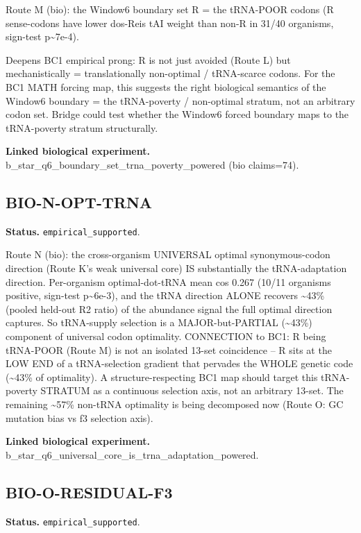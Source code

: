 Route M (bio): the Window6 boundary set R = the tRNA-POOR codons (R sense-codons have lower dos-Reis
tAI weight than non-R in 31/40 organisms, sign-test p\textasciitilde{}7e-4).

Deepens BC1 empirical prong: R is not just avoided (Route L) but mechanistically = translationally
non-optimal / tRNA-scarce codons. For the BC1 MATH forcing map, this suggests the right biological
semantics of the Window6 boundary = the tRNA-poverty / non-optimal stratum, not an arbitrary codon
set. Bridge could test whether the Window6 forced boundary maps to the tRNA-poverty stratum
structurally.

\textbf{Linked biological experiment.} b\_star\_q6\_boundary\_set\_trna\_poverty\_powered (bio claims=74).

\subsection{BIO-N-OPT-TRNA}
\textbf{Status.} \texttt{empirical\_supported}.

Route N (bio): the cross-organism UNIVERSAL optimal synonymous-codon direction (Route K's weak
universal core) IS substantially the tRNA-adaptation direction. Per-organism optimal-dot-tRNA mean
cos 0.267 (10/11 organisms positive, sign-test p\textasciitilde{}6e-3), and the tRNA direction ALONE
recovers \textasciitilde{}43\% (pooled held-out R2 ratio) of the abundance signal the full optimal
direction captures. So tRNA-supply selection is a MAJOR-but-PARTIAL (\textasciitilde{}43\%)
component of universal codon optimality. CONNECTION to BC1: R being tRNA-POOR (Route M) is not an
isolated 13-set coincidence -- R sits at the LOW END of a tRNA-selection gradient that pervades the
WHOLE genetic code (\textasciitilde{}43\% of optimality). A structure-respecting BC1 map should
target this tRNA-poverty STRATUM as a continuous selection axis, not an arbitrary 13-set. The
remaining \textasciitilde{}57\% non-tRNA optimality is being decomposed now (Route O: GC mutation
bias vs f3 selection axis).

\textbf{Linked biological experiment.} b\_star\_q6\_universal\_core\_is\_trna\_adaptation\_powered.

\subsection{BIO-O-RESIDUAL-F3}
\textbf{Status.} \texttt{empirical\_supported}.

